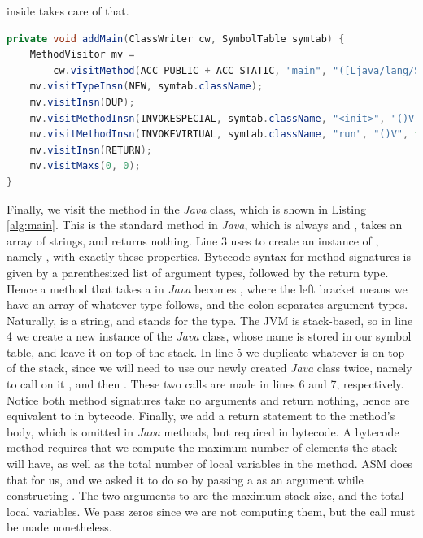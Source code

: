 inside  takes care of that.

\begin{lstlisting}[language=Java,caption={Using the ASM framework to construct a \il{main} method.},label={alg:main}]
private void addMain(ClassWriter cw, SymbolTable symtab) {
	MethodVisitor mv =
		cw.visitMethod(ACC_PUBLIC + ACC_STATIC, "main", "([Ljava/lang/String;)V", null, null);
	mv.visitTypeInsn(NEW, symtab.className);
	mv.visitInsn(DUP);
	mv.visitMethodInsn(INVOKESPECIAL, symtab.className, "<init>", "()V", false);
	mv.visitMethodInsn(INVOKEVIRTUAL, symtab.className, "run", "()V", false);
	mv.visitInsn(RETURN);
	mv.visitMaxs(0, 0);
}
\end{lstlisting}

Finally, we visit the  method in the \emph{Java} class, which is shown in Listing \ref{alg:main}. This is the standard  method in \emph{Java}, which is always  and , takes an array of strings, and returns nothing. Line 3 uses  to create an instance of , namely , with exactly these properties. Bytecode syntax for method signatures is given by a parenthesized list of argument types, followed by the return type. Hence a  method that takes a  in \emph{Java} becomes \il{([Ljava/lang/String;)V}, where the left bracket means we have an array of whatever type follows, and the colon separates argument types. Naturally,  is a string, and  stands for the  type. The JVM is stack-based, so in line 4 we create a new instance of the \emph{Java} class, whose name is stored in our symbol table, and leave it on top of the stack. In line 5 we duplicate whatever is on top of the stack, since we will need to use our newly created \emph{Java} class twice, namely to call on it , and then . These two calls are made in lines 6 and 7, respectively. Notice both method signatures take no arguments and return nothing, hence are equivalent to  in bytecode. Finally, we add a return statement to the  method's body, which is omitted in  \emph{Java} methods, but required in bytecode. A bytecode method requires that we compute the maximum number of elements the stack will have, as well as the total number of local variables in the method. ASM does that for us, and we asked it to do so by passing a  as an argument while constructing . The two arguments to  are the maximum stack size, and the total local variables. We pass zeros since we are not computing them, but the call must be made nonetheless.

